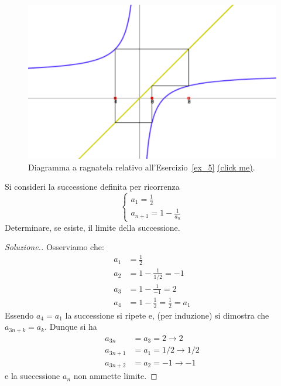 \documentclass[italian,a4paper]{scrartcl}
\newcommand{\online}[1]{\href{http://paolini.github.io/recurrence/?#1}{\underline{(click
      me)}}}
\begin{document}
\begin{figure}
  \begin{center}
    \includegraphics[width=\textwidth]{fig_ex_5.png}
  \end{center}
  \caption{Diagramma a ragnatela relativo
    all'Esercizio~\ref{ex_5} \online{expr=1-1\%2Fx&x=0.5&scale=50}.}
  \label{fig_ex_5}
\end{figure}

\begin{exercise}\label{ex_5}
  Si consideri la successione definita per ricorrenza
  \[
  \begin{cases}
    a_1 = \frac 1 2\\
    a_{n+1} = 1- \frac{1}{a_n}
  \end{cases}
  \]
  Determinare, se esiste, il limite della successione.
\end{exercise}

\begin{proof}[Soluzione.]
  Osserviamo che:
  \begin{align*}
    a_1 &= \frac 1 2 \\
    a_2 &= 1 - \frac{1}{1/2} = -1\\
    a_3 &= 1 - \frac{1}{-1} = 2\\
    a_4 &= 1 - \frac{1}{2} = \frac 1 2 = a_1
  \end{align*}
  Essendo $a_4 = a_1$ la successione si ripete e, (per induzione) si
  dimostra che $a_{3n+k} = a_k$. Dunque si ha
  \begin{align*}
    a_{3n} &= a_3 = 2 \to 2\\
    a_{3n+1} &= a_1 = 1/2 \to 1/2\\
    a_{3n+2} &= a_2 = -1 \to -1
  \end{align*}
  e la successione $a_n$ non ammette limite.
\end{proof}
\end{document}
